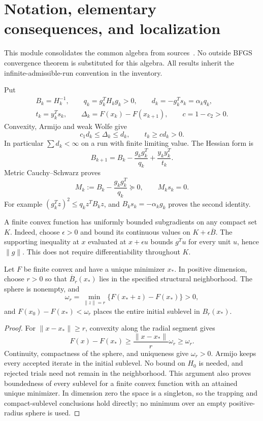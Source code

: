 \section{Notation, elementary consequences, and localization}
\label{M:notation}
This module consolidates the common algebra from sources~\cite{SM,SH,SQ,SU}. No outside BFGS convergence theorem is substituted for this algebra. All results inherit the infinite-admissible-run convention in the inventory.

Put
\[
 \begin{gathered}
 B_k=H_k^{-1},\qquad q_k=g_k^TH_kg_k>0,\qquad d_k=-g_k^Ts_k=\alpha_kq_k,\\
 t_k=y_k^Ts_k,\qquad\Delta_k=F(x_k)-F(x_{k+1}),\qquad c=1-c_2>0.
 \end{gathered}
\]
Convexity, Armijo and weak Wolfe give
\begin{equation}\label{M:basic}
 c_1d_k\le\Delta_k\le d_k,\qquad t_k\ge c d_k>0.
\end{equation}
In particular $\sum d_k<\infty$ on a run with finite limiting value. The Hessian form is
\begin{equation}\label{M:hessian}
 B_{k+1}=B_k-\frac{g_kg_k^T}{q_k}+\frac{y_ky_k^T}{t_k}.
\end{equation}
Metric Cauchy--Schwarz proves
\begin{equation}\label{M:annihilation}
 M_k:=B_k-\frac{g_kg_k^T}{q_k}\succeq0,\qquad M_ks_k=0.
\end{equation}
For example $(g_k^Tz)^2\le q_k z^TB_kz$, and $B_ks_k=-\alpha_kg_k$ proves the second identity.

A finite convex function has uniformly bounded subgradients on any compact set $K$. Indeed, choose $\epsilon>0$ and bound its continuous values on $K+\epsilon\overline B$. The supporting inequality at $x$ evaluated at $x+\epsilon u$ bounds $g^Tu$ for every unit $u$, hence $\|g\|$. This does not require differentiability throughout $K$.

\begin{lemma}\label{M:localization}
Let $F$ be finite convex and have a unique minimizer $x_*$. In positive dimension, choose $r>0$ so that $\overline B_r(x_*)$ lies in the specified structural neighborhood. The sphere is nonempty, and
\[
 \omega_r=\min_{\|z\|=r}\{F(x_*+z)-F(x_*)\}>0,
\]
and $F(x_0)-F(x_*)<\omega_r$ places the entire initial sublevel in $B_r(x_*)$.
\end{lemma}
\begin{proof}
For $\|x-x_*\|\ge r$, convexity along the radial segment gives
\[
 F(x)-F(x_*)\ge\frac{\|x-x_*\|}{r}\omega_r\ge\omega_r.
\]
Continuity, compactness of the sphere, and uniqueness give $\omega_r>0$. Armijo keeps every accepted iterate in the initial sublevel. No bound on $H_0$ is needed, and rejected trials need not remain in the neighborhood. This argument also proves boundedness of every sublevel for a finite convex function with an attained unique minimizer. In dimension zero the space is a singleton, so the trapping and compact-sublevel conclusions hold directly; no minimum over an empty positive-radius sphere is used.
\end{proof}

